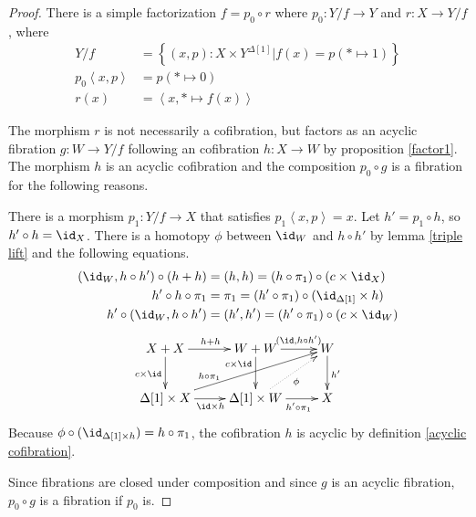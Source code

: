 \documentclass{tac}
\newcommand\set[1]{\left\{#1\right\}}
\newcommand\of{:}
\newcommand\simplex\Delta
\newcommand\tuplet[1]{\left\langle #1 \right\rangle}
\begin{document}
\begin{proof} There is a simple factorization $f = p_0\circ r$ where $p_0\of Y/f\to Y$ and $r\of X\to Y/f$, where 
\begin{align*}
Y/f &= \set{(x,p)\of X\times Y^{\simplex[1]}| f(x) = p(*\mapsto 1) }\\
p_0\tuplet{x,p} &= p(*\mapsto 0)\\
r(x) &= \tuplet{x,*\mapsto f(x)}
\end{align*}

The morphism $r$ is not necessarily a cofibration, but factors as an acyclic fibration $g\of W\to Y/f$ following an cofibration $h\of X\to W$ by proposition \ref{factor1}. The morphism $h$ is an acyclic cofibration and the composition $p_0\circ g$ is a fibration for the following reasons.


There is a morphism $p_1\of Y/f\to X$ that satisfies $p_1\tuplet{x,p}=x$. Let $h'=p_1\circ h$, so $h'\circ h = \id_X$.
There is a homotopy $\phi$ between $\id_{W}$ and $h\circ h'$ by lemma \ref{triple lift} and the following equations. %
\begin{align*}
(\id_W,h\circ h')\circ(h+h)&=(h,h)= (h\circ\pi_1)\circ (c\times \id_X)\\
h'\circ h\circ \pi_1&=\pi_1=(h'\circ\pi_1)\circ(\id_{\simplex[1]}\times h)\\
h'\circ(\id_W,h\circ h')&=(h',h')= (h'\circ\pi_1)\circ (c\times \id_W)
\end{align*}
\[\xymatrix{
X+X\ar[d]_{c\times \id}\ar[r]^{h+h} & W+W\ar[d]_(.3){c\times \id}\ar[r]^(.6){(\id,h\circ h')} & W\ar[d]^{h'}\\
\simplex[1]\times X\ar[r]_{\id\times h} \ar[urr]^(.3){h\circ\pi_1}  & \simplex[1]\times W\ar[r]_(.6){h'\circ\pi_1} \ar@{.>}[ur]_\phi & X
}\]
Because $\phi\circ(\id_{\simplex[1]\times h}) = h\circ \pi_1$, the cofibration $h$ is acyclic by definition \ref{acyclic cofibration}. 

Since fibrations are closed under composition and since $g$ is an acyclic fibration, $p_0\circ g$ is a fibration if $p_0$ is. 


\end{proof}
\end{document}
